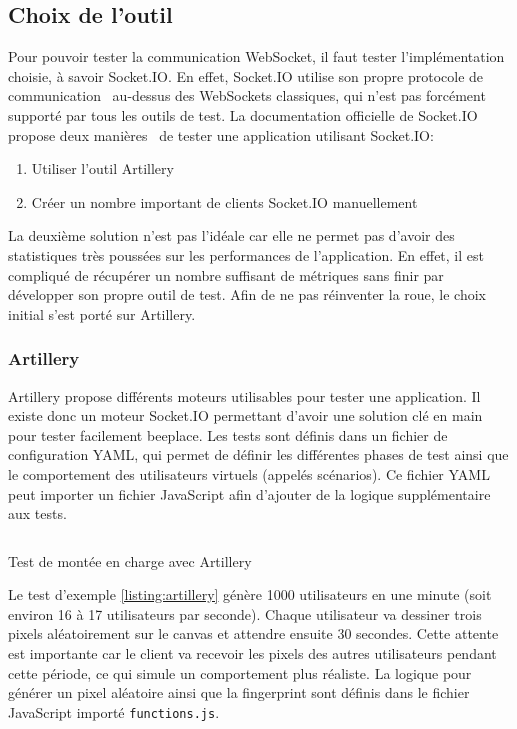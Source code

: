 \subsection{Choix de l'outil}

Pour pouvoir tester la communication WebSocket, il faut tester l'implémentation choisie, à savoir Socket.IO. En effet, Socket.IO utilise son propre protocole de communication~\cite{socket-io-protocol} au-dessus des WebSockets classiques, qui n'est pas forcément supporté par tous les outils de test. La documentation officielle de Socket.IO propose deux manières~\cite{socket-io-load-testing} de tester une application utilisant Socket.IO:

\begin{enumerate}
  \item Utiliser l'outil Artillery~\cite{artillery}
  \item Créer un nombre important de clients Socket.IO manuellement
\end{enumerate}

La deuxième solution n'est pas l'idéale car elle ne permet pas d'avoir des statistiques très poussées sur les performances de l'application. En effet, il est compliqué de récupérer un nombre suffisant de métriques sans finir par développer son propre outil de test. Afin de ne pas réinventer la roue, le choix initial s'est porté sur Artillery.

\subsubsection{Artillery}

Artillery propose différents moteurs utilisables pour tester une application. Il existe donc un moteur Socket.IO permettant d'avoir une solution clé en main pour tester facilement \gls{beeplace}. Les tests sont définis dans un fichier de configuration YAML, qui permet de définir les différentes phases de test ainsi que le comportement des utilisateurs virtuels (appelés scénarios). Ce fichier YAML peut importer un fichier JavaScript afin d'ajouter de la logique supplémentaire aux tests.

\begin{listing}[h]
  \inputminted[linenos]{yaml}{assets/figures/artillery-test.yml}
  \caption{Test de montée en charge avec Artillery}
  \label{listing:artillery}
\end{listing}

Le test d'exemple \ref{listing:artillery} génère 1000 utilisateurs en une minute (soit environ 16 à 17 utilisateurs par seconde). Chaque utilisateur va dessiner trois pixels aléatoirement sur le canvas et attendre ensuite 30 secondes. Cette attente est importante car le client va recevoir les pixels des autres utilisateurs pendant cette période, ce qui simule un comportement plus réaliste. La logique pour générer un pixel aléatoire ainsi que la fingerprint sont définis dans le fichier JavaScript importé \texttt{functions.js}.

